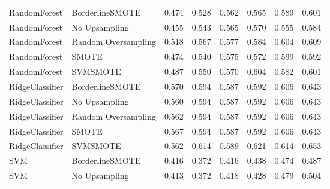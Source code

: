 \begin{tabular}{llllllll}
                RandomForest &     BorderlineSMOTE & 0.474 &                     0.528 &                 0.562 &                  0.565 &                                   0.589 &    0.601 \\
                RandomForest &       No Upsampling & 0.455 &                     0.543 &                 0.565 &                  0.570 &                                   0.555 &    0.584 \\
                RandomForest & Random Oversampling & 0.518 &                     0.567 &                 0.577 &                  0.584 &                                   0.604 &    0.609 \\
                RandomForest &               SMOTE & 0.474 &                     0.540 &                 0.575 &                  0.572 &                                   0.599 &    0.592 \\
                RandomForest &            SVMSMOTE & 0.487 &                     0.550 &                 0.570 &                  0.604 &                                   0.582 &    0.601 \\
             RidgeClassifier &     BorderlineSMOTE & 0.570 &                     0.594 &                 0.587 &                  0.592 &                                   0.606 &    0.643 \\
             RidgeClassifier &       No Upsampling & 0.560 &                     0.594 &                 0.587 &                  0.592 &                                   0.606 &    0.643 \\
             RidgeClassifier & Random Oversampling & 0.562 &                     0.594 &                 0.587 &                  0.592 &                                   0.606 &    0.643 \\
             RidgeClassifier &               SMOTE & 0.567 &                     0.594 &                 0.587 &                  0.592 &                                   0.606 &    0.643 \\
             RidgeClassifier &            SVMSMOTE & 0.562 &                     0.614 &                 0.589 &                  0.621 &                                   0.614 &    0.653 \\
                         SVM &     BorderlineSMOTE & 0.416 &                     0.372 &                 0.416 &                  0.438 &                                   0.474 &    0.487 \\
                         SVM &       No Upsampling & 0.413 &                     0.372 &                 0.418 &                  0.428 &                                   0.479 &    0.504 \\

\end{tabular}
